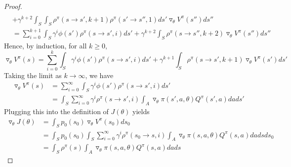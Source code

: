 \documentclass[11pt]{article}
\theoremstyle{definition}
\begin{document}
\begin{proof}
\begin{equation}
\begin{split}
\\
&+ \gamma^{k+2} \int_S \int_S \rho^{\pi}(s \rightarrow s',k+1) \rho^{\pi}(s' \rightarrow s'',1) ds' \triangledown_{\theta} V^{\pi}(s'') ds''
\\
&= \sum_{i=0}^{k+1} \int_S \gamma^i \phi(s') \rho^{\pi}(s \rightarrow s',i)ds'
+ \gamma^{k+2} \int_S \rho^{\pi}(s \rightarrow s'',k+2) \triangledown_{\theta} V^{\pi}(s'') ds''
\end{split}
\end{equation}
Hence, by induction, for all $k \ge 0$,
\begin{equation}
\triangledown_{\theta}V^{\pi}(s) = \sum_{i=0}^k \int_S \gamma^i \phi(s') \rho^{\pi}(s \rightarrow s',i)ds' + \gamma^{k+1} \int_S \rho^{\pi}(s \rightarrow s',k+1) \triangledown_{\theta} V^{\pi}(s')ds'
\end{equation}
Taking the limit as $k \rightarrow \infty$, we have
\begin{equation}
\begin{split}
\triangledown_{\theta}V^{\pi}(s) &= \sum_{i=0}^{\infty} \int_S \gamma^i \phi(s') \rho^{\pi}(s \rightarrow s',i)ds' \\
&= 
\int_S \sum_{i=0}^{\infty} \gamma^i \rho^{\pi}(s \rightarrow s',i) \int_A \triangledown_{\theta} \pi(s',a,\theta) Q^{\pi}(s',a) da ds'
\end{split}
\end{equation}
Plugging this into the definition of $J(\theta)$ yields
\begin{equation}
\begin{split}
\triangledown_{\theta}J(\theta) &= \int_S p_0(s_0) \triangledown_{\theta}V^{\pi}(s_0)ds_0
\\
&= \int_S p_0(s_0) \int_S \sum_{i=0}^{\infty} \gamma^i \rho^{\pi}(s_0 \rightarrow s,i) \int_A \triangledown_{\theta} \pi(s,a,\theta) Q^{\pi}(s,a) da ds
ds_0
\\
&= \int_S \rho^{\pi}(s) \int_A \triangledown_{\theta} \pi(s,a,\theta) Q^{\pi}(s,a)dads
\end{split}
\end{equation}
\end{proof}
\end{document}
